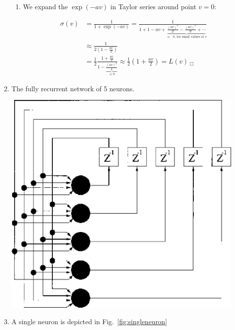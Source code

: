 \documentclass[10pt,a4]{article}
\begin{document}
\begin{enumerate}
\begin{enumerate}
  \item We expand the $\exp(-av)$ in Taylor series around point $v=0$:
    
    \begin{equation}
      \begin{split}
      \sigma(v) &= \frac{1}{1 + \exp(-av)} = \frac{1}{1 + 1 - av +
        \underbrace{\frac{(av)^2}{2!} - \frac{(av)^3}{3!} +
          \cdots}_{\mbox{$\approx$ $0$, for small values of $v$}}} \\ 
      &\approx \frac{1}{2 ( 1 - \frac{av}{2})} \\
      &= \frac{1}{2} \frac{1 + \frac{av}{2}} {1 -
        \underbrace{\frac{(av)^2}{4}}_{\approx 0}} \approx \frac{1}{2}
      \left(1 + \frac{av}{2} \right) = L(v) \: _\Box
      \end{split}
    \end{equation}
    
  \end{enumerate}
  
\newpage
\item The fully recurrent network of 5 neurons.
 
  \begin{center}
    \includegraphics[width=12cm]{recurrent5.eps}
  \end{center}

  

\item A single neuron is depicted in Fig.~\ref{fig:singleneuron}



\end{enumerate}
\end{document}
